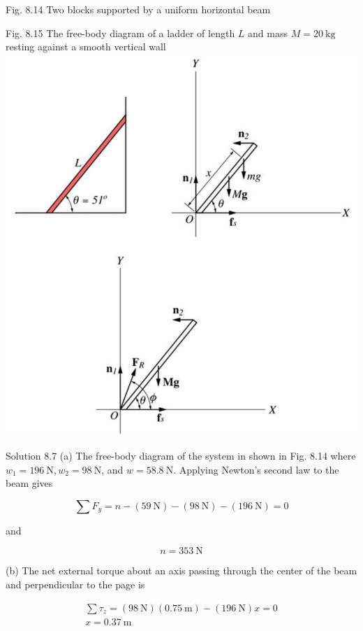 \documentclass[10pt]{article}
\begin{document}
Fig. 8.14 Two blocks supported by a uniform horizontal beam

Fig. 8.15 The free-body diagram of a ladder of length $L$ and mass $M=20 \mathrm{~kg}$ resting against a smooth vertical wall\\
\includegraphics[max width=\textwidth, center]{2024_09_13_db1f357d2aad0a03eb2eg-137}

Solution 8.7 (a) The free-body diagram of the system in shown in Fig. 8.14 where $w_{1}=196 \mathrm{~N}, w_{2}=98 \mathrm{~N}$, and $w=58.8 \mathrm{~N}$. Applying Newton's second law to the beam gives

$$
\sum F_{y}=n-(59 \mathrm{~N})-(98 \mathrm{~N})-(196 \mathrm{~N})=0
$$

and

$$
n=353 \mathrm{~N}
$$

(b) The net external torque about an axis passing through the center of the beam and perpendicular to the page is

$$
\begin{gathered}
\sum \tau_{z}=(98 \mathrm{~N})(0.75 \mathrm{~m})-(196 \mathrm{~N}) x=0 \\
x=0.37 \mathrm{~m}
\end{gathered}
$$
\end{document}
